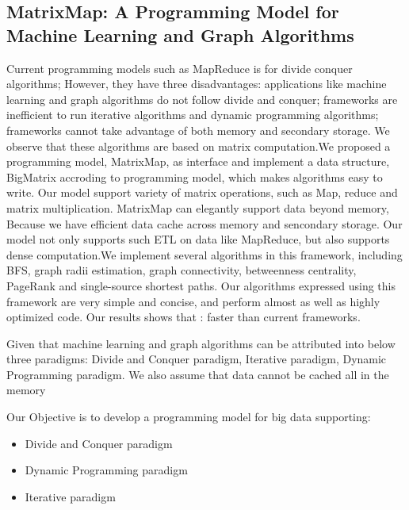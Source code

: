 \subsection{MatrixMap: A Programming Model for Machine Learning and Graph Algorithms}

Current programming models such as MapReduce is for divide conquer algorithms; However, they have three disadvantages:
applications like machine learning and graph algorithms do not follow divide and conquer; frameworks are inefficient to run iterative algorithms and dynamic programming algorithms; frameworks cannot take advantage of both memory and secondary storage.
We observe that these algorithms are based on matrix computation.We proposed a programming model, MatrixMap, as interface and implement a data structure, BigMatrix accroding to programming model, which makes algorithms easy to write. Our model support variety of matrix operations, such as Map, reduce and matrix multiplication. MatrixMap can elegantly support data beyond memory, Because we have efficient data cache across memory and sencondary storage. Our model not only supports such ETL on data like MapReduce, but also supports dense computation.We implement several algorithms in this framework, including BFS, graph radii estimation, graph connectivity, betweenness centrality, PageRank and single-source shortest paths. Our algorithms expressed using this framework are very simple and concise, and perform almost as well as highly optimized code. Our results shows that : faster than current frameworks.

Given that machine learning and graph algorithms can be attributed into below three paradigms: Divide and Conquer paradigm, Iterative paradigm, Dynamic Programming paradigm. We also assume that data cannot be cached all in the memory

Our Objective is to develop a programming model for big data supporting:
\begin{itemize}
  \item Divide and Conquer paradigm
  \item Dynamic Programming paradigm
  \item Iterative paradigm
\end{itemize}

	





